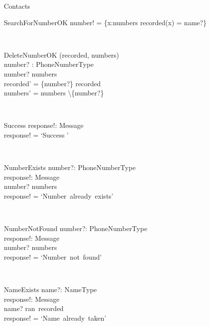 \begin{class}{Contacts}
\begin{op}{SearchForNumberOK}
    number! = \{x:numbers  \mid recorded(x) = name?\}
\end{op}\\
\begin{op}{DeleteNumberOK}
\Delta (recorded, numbers) \\
number? : PhoneNumberType\\
\ST
number? \in numbers\\
recorded' = \{number?\} \ndres recorded\\
numbers' = numbers \backslash \{number?\}\\
\end{op}\\
\zbreak
\begin{op}{Success}
response!: Message \\
\ST
response! = `Success '
\end{op}\\
\begin{op}{NumberExists}
number?: PhoneNumberType \\
response!: Message \\
\ST
number? \in numbers \\
response! = `Number~already~exists'
\end{op}\\
\begin{op}{NumberNotFound}
number?: PhoneNumberType \\
response!: Message \\
\ST
number? \notin numbers \\
response! = `Number~not~found'
\end{op}\\
\begin{op}{NameExists}
name?: NameType \\
response!: Message \\
\ST
name? \in ran~recorded \\
response! = `Name~already~taken'
\end{op}\\

\end{class}
